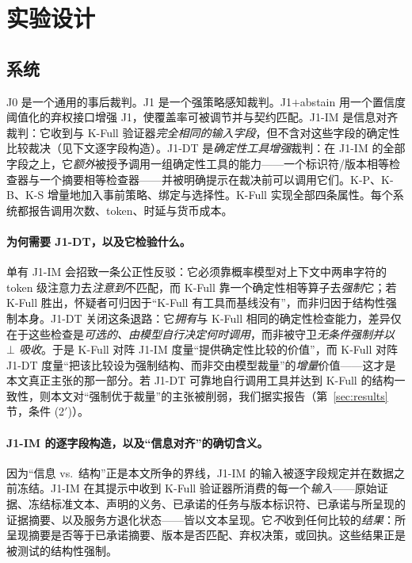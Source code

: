 \documentclass[11pt]{ctexart}
\begin{document}
\section{实验设计}
\label{sec:study}
\subsection{系统}
J0 是一个通用的事后裁判。J1 是一个强策略感知裁判。J1$+$abstain 用一个置信度阈值化的弃权接口增强 J1，使覆盖率可被调节并与契约匹配。J1-IM 是信息对齐裁判：它收到与 K-Full 验证器\emph{完全相同的输入字段}，但不含对这些字段的确定性比较裁决（见下文逐字段构造）。J1-DT 是\emph{确定性工具增强}裁判：在 J1-IM 的全部字段之上，它\emph{额外}被授予调用一组确定性工具的能力——一个标识符/版本相等检查器与一个摘要相等检查器——并被明确提示在裁决前可以调用它们。K-P、K-B、K-S 增量地加入事前策略、绑定与选择性。K-Full 实现全部四条属性。每个系统都报告调用次数、token、时延与货币成本。

\paragraph{为何需要 J1-DT，以及它检验什么。} 单有 J1-IM 会招致一条公正性反驳：它必须靠概率模型对上下文中两串字符的 token 级注意力去\emph{注意到}不匹配，而 K-Full 靠一个确定性相等算子去\emph{强制}它；若 K-Full 胜出，怀疑者可归因于“K-Full 有工具而基线没有”，而非归因于结构性强制本身。J1-DT 关闭这条退路：它\emph{拥有}与 K-Full 相同的确定性检查能力，差异仅在于这些检查是\emph{可选的、由模型自行决定何时调用}，而非被守卫\emph{无条件强制并以 $\bot$ 吸收}。于是 K-Full 对阵 J1-IM 度量“提供确定性比较的价值”，而 K-Full 对阵 J1-DT 度量“把该比较设为强制结构、而非交由模型裁量”的\emph{增量}价值——这才是本文真正主张的那一部分。若 J1-DT 可靠地自行调用工具并达到 K-Full 的结构一致性，则本文对“强制优于裁量”的主张被削弱，我们据实报告（第~\ref{sec:results} 节，条件 (2$'$)）。

\paragraph{J1-IM 的逐字段构造，以及“信息对齐”的确切含义。} 因为“信息 vs.\ 结构”正是本文所争的界线，J1-IM 的输入被逐字段规定并在数据之前冻结。J1-IM 在其提示中收到 K-Full 验证器所消费的每一个\emph{输入}——原始证据、冻结标准文本、声明的义务、已承诺的任务与版本标识符、已承诺与所呈现的证据摘要、以及服务方退化状态——皆以文本呈现。它\emph{不}收到任何比较的\emph{结果}：所呈现摘要是否等于已承诺摘要、版本是否匹配、弃权决策，或回执。这些结果正是被测试的结构性强制。
\end{document}
